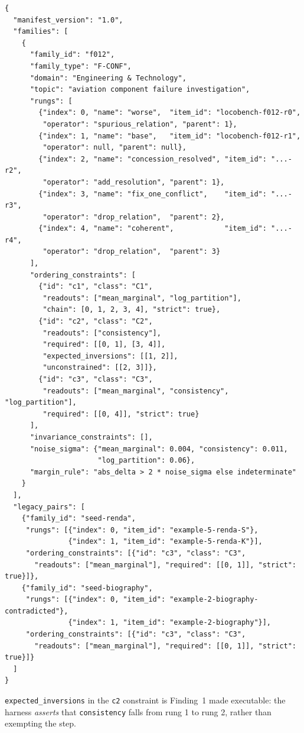 \documentclass[11pt]{article}
\newcommand{\readout}[1]{\texttt{#1}}
\begin{document}
\begin{small}
\begin{verbatim}
{
  "manifest_version": "1.0",
  "families": [
    {
      "family_id": "f012",
      "family_type": "F-CONF",
      "domain": "Engineering & Technology",
      "topic": "aviation component failure investigation",
      "rungs": [
        {"index": 0, "name": "worse",  "item_id": "locobench-f012-r0",
         "operator": "spurious_relation", "parent": 1},
        {"index": 1, "name": "base",   "item_id": "locobench-f012-r1",
         "operator": null, "parent": null},
        {"index": 2, "name": "concession_resolved", "item_id": "...-r2",
         "operator": "add_resolution", "parent": 1},
        {"index": 3, "name": "fix_one_conflict",    "item_id": "...-r3",
         "operator": "drop_relation",  "parent": 2},
        {"index": 4, "name": "coherent",            "item_id": "...-r4",
         "operator": "drop_relation",  "parent": 3}
      ],
      "ordering_constraints": [
        {"id": "c1", "class": "C1",
         "readouts": ["mean_marginal", "log_partition"],
         "chain": [0, 1, 2, 3, 4], "strict": true},
        {"id": "c2", "class": "C2",
         "readouts": ["consistency"],
         "required": [[0, 1], [3, 4]],
         "expected_inversions": [[1, 2]],
         "unconstrained": [[2, 3]]},
        {"id": "c3", "class": "C3",
         "readouts": ["mean_marginal", "consistency", "log_partition"],
         "required": [[0, 4]], "strict": true}
      ],
      "invariance_constraints": [],
      "noise_sigma": {"mean_marginal": 0.004, "consistency": 0.011,
                      "log_partition": 0.06},
      "margin_rule": "abs_delta > 2 * noise_sigma else indeterminate"
    }
  ],
  "legacy_pairs": [
    {"family_id": "seed-renda",
     "rungs": [{"index": 0, "item_id": "example-5-renda-S"},
               {"index": 1, "item_id": "example-5-renda-K"}],
     "ordering_constraints": [{"id": "c3", "class": "C3",
       "readouts": ["mean_marginal"], "required": [[0, 1]], "strict": true}]},
    {"family_id": "seed-biography",
     "rungs": [{"index": 0, "item_id": "example-2-biography-contradicted"},
               {"index": 1, "item_id": "example-2-biography"}],
     "ordering_constraints": [{"id": "c3", "class": "C3",
       "readouts": ["mean_marginal"], "required": [[0, 1]], "strict": true}]}
  ]
}
\end{verbatim}
\end{small}

\texttt{expected\_inversions} in the \texttt{c2} constraint is Finding~1 made executable: the
harness \emph{asserts} that \readout{consistency} falls from rung 1 to rung 2, rather than
exempting the step.
\end{document}
